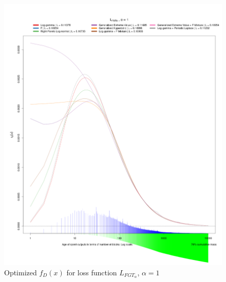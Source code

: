 \documentclass[english]{article}
\begin{document}
\begin{figure}
\caption{Optimized $f_{D}(x)$ for loss function $L_{FGT_{\alpha}}$, $\alpha=1$}

\includegraphics[scale=0.35]{images/dry-run/estimate/estimate-L_FGT-flavor-1}
\end{figure}
\end{document}
